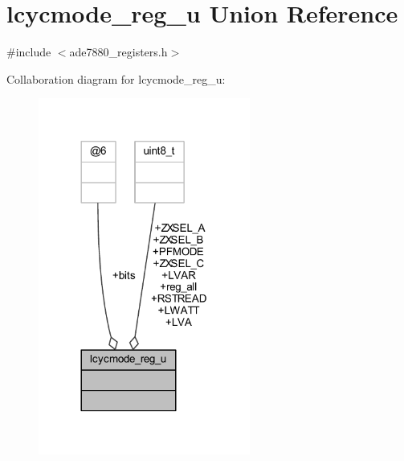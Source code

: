 \hypertarget{a00026}{\section{lcycmode\-\_\-reg\-\_\-u Union Reference}
\label{d6/d5b/a00026}
}


{\ttfamily \#include $<$ade7880\-\_\-registers.\-h$>$}



Collaboration diagram for lcycmode\-\_\-reg\-\_\-u\-:\nopagebreak
\begin{figure}[H]
\begin{center}
\leavevmode
\includegraphics[width=197pt]{db/dab/a00089}
\end{center}
\end{figure}
